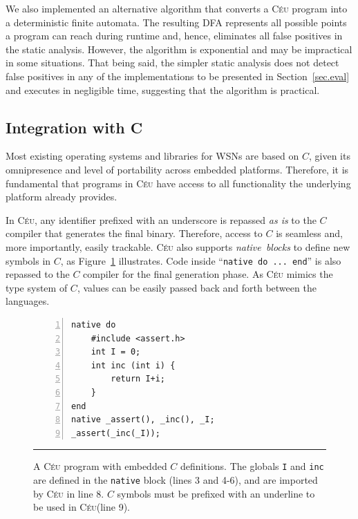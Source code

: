 \documentclass[letterpaper]{sig-alternate}
\newcommand{\code}[1] {{\small{\texttt{#1}}}}
\newcommand{\CEU}{\textsc{C\'{e}u}\xspace}
\begin{document}
We also implemented an alternative algorithm that converts a \CEU program into 
a deterministic finite automata.
The resulting DFA represents all possible points a program can reach during 
runtime and, hence, eliminates all false positives in the static analysis.
However, the algorithm is exponential and may be impractical in some 
situations.
%
That being said, the simpler static analysis does not detect false positives in 
any of the
implementations to be presented in Section~\ref{sec.eval} and executes in 
negligible time, suggesting that the algorithm is practical.

\subsection{Integration with C}
\label{sec.ceu.c}

Most existing operating systems and libraries for WSNs are based on $C$, given 
its omnipresence and level of portability across embedded platforms.
Therefore, it is fundamental that programs in \CEU have access to all 
functionality the underlying platform already provides.

In \CEU, any identifier prefixed with an underscore is repassed \emph{as is} to 
the $C$ compiler that generates the final binary.
Therefore, access to $C$ is seamless and, more importantly, easily trackable.
%
\CEU also supports \emph{native~blocks} to define new symbols in $C$, as 
Figure~\ref{lst.c} illustrates.
Code inside ``\code{native~do~...~end}'' is also repassed to the $C$ compiler 
for the final generation phase.
As \CEU{} mimics the type system of $C$, values can be easily passed back and 
forth between the languages.

\begin{figure}[t]
\begin{lstlisting}[numbers=left,xleftmargin=2em]
native do
    #include <assert.h>
    int I = 0;
    int inc (int i) {
        return I+i;
    }
end
native _assert(), _inc(), _I;
_assert(_inc(_I));
\end{lstlisting}
%
\rule{8.5cm}{0.37pt}
\caption{ A \CEU program with embedded $C$ definitions.
{\small %
The globals \code{I} and \code{inc} are defined in the \code{native} block 
(lines 3 and 4-6), and are imported by \CEU in line 8.
$C$ symbols must be prefixed with an underline to be used in \CEU (line 9).
}%
\label{lst.c}
}
\end{figure}
\end{document}
